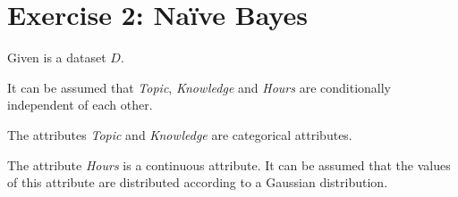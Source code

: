 \documentclass[
english,
smallborders
]{i6prcsht}
\begin{document}
\newpage

\section*{Exercise 2: Naïve Bayes}

\begin{minipage}{.375\textwidth}
	Given is a dataset $D$.
	
	\vspace*{0.5cm}
	
	It can be assumed that \textit{Topic}, \textit{Knowledge} and \textit{Hours} are conditionally independent of each other.
	
	\vspace*{0.5cm}
	
	The attributes \textit{Topic} and \textit{Knowledge} are categorical attributes.
	
	\vspace*{0.1cm}
	
	The attribute \textit{Hours} is a continuous attribute. It can be assumed that the values of this attribute are distributed according to a Gaussian distribution.
\end{minipage}
\begin{minipage}{.625\textwidth}
	\begin{flushright}	
	\end{flushright}
\end{minipage}
\end{document}
